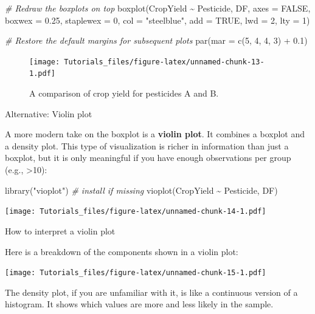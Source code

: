 \documentclass[
]{book}
\newenvironment{Shaded}{\begin{snugshade}}{\end{snugshade}}
\newcommand{\AttributeTok}[1]{\textcolor[rgb]{0.77,0.63,0.00}{#1}}
\newcommand{\CommentTok}[1]{\textcolor[rgb]{0.56,0.35,0.01}{\textit{#1}}}
\newcommand{\ConstantTok}[1]{\textcolor[rgb]{0.00,0.00,0.00}{#1}}
\newcommand{\DecValTok}[1]{\textcolor[rgb]{0.00,0.00,0.81}{#1}}
\newcommand{\FloatTok}[1]{\textcolor[rgb]{0.00,0.00,0.81}{#1}}
\newcommand{\FunctionTok}[1]{\textcolor[rgb]{0.00,0.00,0.00}{#1}}
\newcommand{\NormalTok}[1]{#1}
\newcommand{\SpecialCharTok}[1]{\textcolor[rgb]{0.00,0.00,0.00}{#1}}
\newcommand{\StringTok}[1]{\textcolor[rgb]{0.31,0.60,0.02}{#1}}
\begin{document}
\begin{Shaded}
\begin{Highlighting}[]
\CommentTok{\# Redraw the boxplots on top}
\FunctionTok{boxplot}\NormalTok{(CropYield }\SpecialCharTok{\textasciitilde{}}\NormalTok{ Pesticide, DF, }\AttributeTok{axes =} \ConstantTok{FALSE}\NormalTok{, }\AttributeTok{boxwex =} \FloatTok{0.25}\NormalTok{, }\AttributeTok{staplewex =} \DecValTok{0}\NormalTok{,}
        \AttributeTok{col =} \StringTok{"steelblue"}\NormalTok{, }\AttributeTok{add =} \ConstantTok{TRUE}\NormalTok{, }\AttributeTok{lwd =} \DecValTok{2}\NormalTok{, }\AttributeTok{lty =} \DecValTok{1}\NormalTok{)}

\CommentTok{\# Restore the default margins for subsequent plots}
\FunctionTok{par}\NormalTok{(}\AttributeTok{mar =} \FunctionTok{c}\NormalTok{(}\DecValTok{5}\NormalTok{, }\DecValTok{4}\NormalTok{, }\DecValTok{4}\NormalTok{, }\DecValTok{3}\NormalTok{) }\SpecialCharTok{+} \FloatTok{0.1}\NormalTok{)}
\end{Highlighting}
\end{Shaded}

\begin{figure}
\centering
\texttt{[image: Tutorials\_files/figure-latex/unnamed-chunk-13-1.pdf]}
\caption{\label{fig:unnamed-chunk-13}A comparison of crop yield for pesticides A and B.}
\end{figure}

Alternative: Violin plot

A more modern take on the boxplot is a \textbf{violin plot}. It combines a boxplot and a density plot. This type of visualization is richer in information than just a boxplot, but it is only meaningful if you have enough observations per group (e.g., \textgreater10):

\begin{Shaded}
\begin{Highlighting}[]
\FunctionTok{library}\NormalTok{(}\StringTok{"vioplot"}\NormalTok{) }\CommentTok{\# install if missing}
\FunctionTok{vioplot}\NormalTok{(CropYield }\SpecialCharTok{\textasciitilde{}}\NormalTok{ Pesticide, DF)}
\end{Highlighting}
\end{Shaded}

\texttt{[image: Tutorials\_files/figure-latex/unnamed-chunk-14-1.pdf]}

How to interpret a violin plot

Here is a breakdown of the components shown in a violin plot:

\texttt{[image: Tutorials\_files/figure-latex/unnamed-chunk-15-1.pdf]}

The density plot, if you are unfamiliar with it, is like a continuous version of a histogram. It shows which values are more and less likely in the sample.
\end{document}
